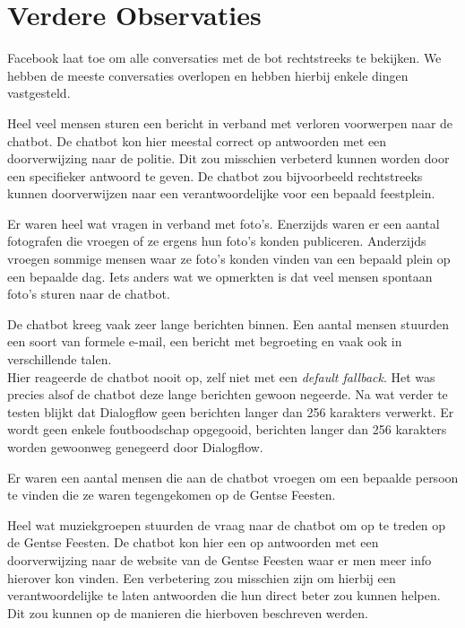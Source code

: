 \documentclass[11pt, letterpaper, oneside]{article}
\begin{document}
	\clearpage
	
	\section{Verdere Observaties}
	
	Facebook laat toe om alle conversaties met de bot rechtstreeks te bekijken. We hebben de meeste conversaties overlopen en hebben hierbij enkele dingen vastgesteld.
	
	Heel veel mensen sturen een bericht in verband met verloren voorwerpen naar de chatbot. De chatbot kon hier meestal correct op antwoorden met een doorverwijzing naar de politie. Dit zou misschien verbeterd kunnen worden door een specifieker antwoord te geven. De chatbot zou bijvoorbeeld rechtstreeks kunnen doorverwijzen naar een verantwoordelijke voor een bepaald feestplein.
	
	Er waren heel wat vragen in verband met foto's. Enerzijds waren er een aantal fotografen die vroegen of ze ergens hun foto's konden publiceren. Anderzijds vroegen sommige mensen waar ze foto's konden vinden van een bepaald plein op een bepaalde dag. Iets anders wat we opmerkten is dat veel mensen spontaan foto's sturen naar de chatbot.
	
	De chatbot kreeg vaak zeer lange berichten binnen. Een aantal mensen stuurden een soort van formele e-mail, een bericht met begroeting en vaak ook in verschillende talen. \\ Hier reageerde de chatbot nooit op, zelf niet met een \textit{default fallback}. Het was precies alsof de chatbot deze lange berichten gewoon negeerde. Na wat verder te testen blijkt dat Dialogflow geen berichten langer dan 256 karakters verwerkt. Er wordt geen enkele foutboodschap opgegooid, berichten langer dan 256 karakters worden gewoonweg genegeerd door Dialogflow.
	
	Er waren een aantal mensen die aan de chatbot vroegen om een bepaalde persoon te vinden die ze waren tegengekomen op de Gentse Feesten.
	
	Heel wat muziekgroepen stuurden de vraag naar de chatbot om op te treden op de Gentse Feesten. De chatbot kon hier een op antwoorden met een doorverwijzing naar de website van de Gentse Feesten waar er men meer info hierover kon vinden. Een verbetering zou misschien zijn om hierbij een verantwoordelijke te laten antwoorden die hun direct beter zou kunnen helpen. Dit zou kunnen op de manieren die hierboven beschreven werden.
	
\end{document}
